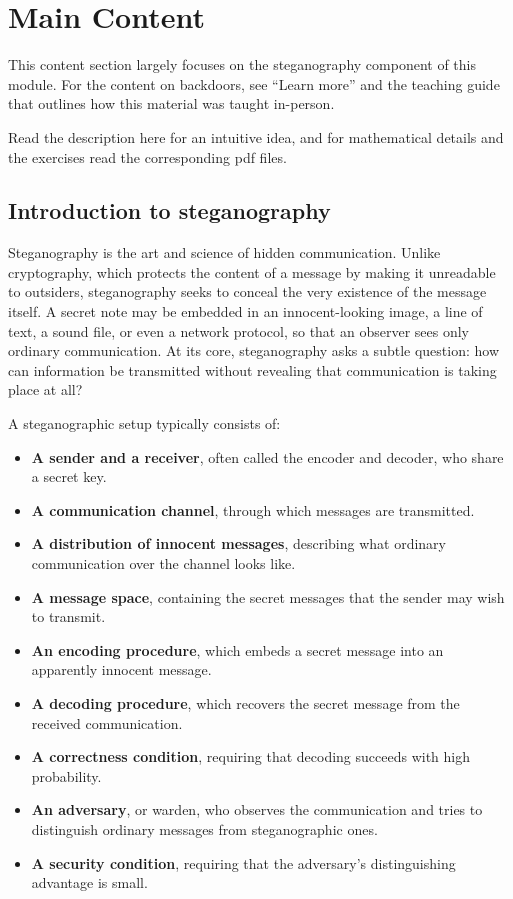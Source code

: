 \documentclass[11pt]{article}
\begin{document}
\section{Main Content}
\label{sec:main-content}

\begin{callout}[note]
This content section largely focuses on the steganography component
of this module. For the content on backdoors, see ``Learn more'' and the
teaching guide that outlines how this material was taught in-person.
\end{callout}

Read the description here for an intuitive idea, and for mathematical details
and the exercises read the corresponding pdf files.

\subsection{Introduction to steganography}
\label{sec:intro-stego}

Steganography is the art and science of hidden communication. Unlike
cryptography, which protects the content of a message by making it unreadable
to outsiders, steganography seeks to conceal the very existence of the message
itself. A secret note may be embedded in an innocent-looking image, a line of
text, a sound file, or even a network protocol, so that an observer sees only
ordinary communication. At its core, steganography asks a subtle question: how
can information be transmitted without revealing that communication is taking
place at all?

A steganographic setup typically consists of:

\begin{itemize}
  \item \textbf{A sender and a receiver}, often called the encoder and decoder,
        who share a secret key.
  \item \textbf{A communication channel}, through which messages are
        transmitted.
  \item \textbf{A distribution of innocent messages}, describing what ordinary
        communication over the channel looks like.
  \item \textbf{A message space}, containing the secret messages that the sender
        may wish to transmit.
  \item \textbf{An encoding procedure}, which embeds a secret message into an
        apparently innocent message.
  \item \textbf{A decoding procedure}, which recovers the secret message from
        the received communication.
  \item \textbf{A correctness condition}, requiring that decoding succeeds with
        high probability.
  \item \textbf{An adversary}, or warden, who observes the communication and
        tries to distinguish ordinary messages from steganographic ones.
  \item \textbf{A security condition}, requiring that the adversary's
        distinguishing advantage is small.
\end{itemize}
\end{document}
